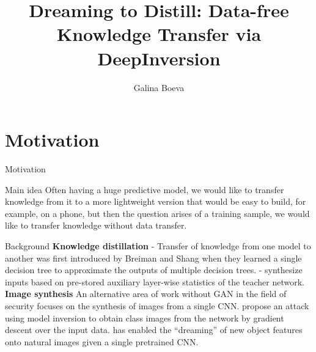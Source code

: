 \documentclass{beamer}
\title{Dreaming to Distill: Data-free Knowledge Transfer via DeepInversion}
\author{Galina Boeva}
\institute{MIPT, 2024}
\begin{document}
\begin{frame}
    \titlepage
\end{frame}


\begin{frame}
    \tableofcontents
\end{frame}


\section{Motivation}
\begin{frame}{Motivation}
    \begin{block}{Main idea}
    Often having a huge predictive model, we would like to transfer knowledge from it to a more lightweight version that would be easy to build, for example, on a phone, but then the question arises of a training sample, we would like to transfer knowledge without data transfer.
    
    \end{block} 
    
\end{frame}

\begin{frame}{Background}
\textbf{Knowledge distillation}
\cite{breiman1996born} - Transfer of knowledge from one
model to another was first introduced by Breiman and
Shang when they learned a single decision tree to approximate the outputs of multiple decision trees. \cite{lopes2017data} - synthesize inputs based on pre-stored auxiliary layer-wise statistics of the teacher network.
\textbf{Image synthesis}
An alternative area of work without GAN in the field of security focuses on
the synthesis of images from a single CNN. \cite{fredrikson2015model} propose
an attack using model inversion to obtain class images from the network by gradient descent over the input data. \cite{mordvintsev2015inceptionism} has enabled
the “dreaming” of new object features onto natural images
given a single pretrained CNN.
\end{frame}
\end{document}
